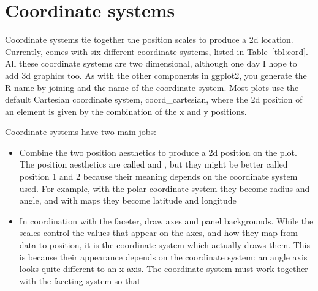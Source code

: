 \section{Coordinate systems}
\label{sec:coord}

Coordinate systems tie together the position scales to produce a 2d location. Currently, \ggplot comes with six different coordinate systems, listed in Table~\ref{tbl:cord}.  All these coordinate systems are two dimensional, although one day I hope to add 3d graphics too. As with the other components in ggplot2, you generate the R name by joining  and the name of the coordinate system.  Most plots use the default Cartesian coordinate system, \f{coord_cartesian}, where the 2d position of an element is given by the combination of the x and y positions.  

Coordinate systems have two main jobs: 

\begin{itemize}
  \item Combine the two position aesthetics to produce a 2d position on the plot.  The position aesthetics are called  and , but they might be better called position 1 and 2 because their meaning depends on the coordinate system used.  For example, with the polar coordinate system they become radius and angle, and with maps they become latitude and longitude
  
  \item In coordination with the faceter, draw axes and panel backgrounds.  While the scales control the values that appear on the axes, and how they map from data to position, it is the coordinate system which actually draws them.  This is because their appearance depends on the coordinate system: an angle axis looks quite different to an x axis.  The coordinate system must work together with the faceting system so that 

\end{itemize}



